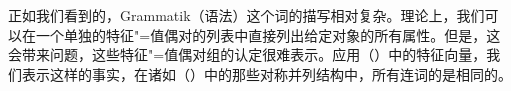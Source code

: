 
正如我们看到的，Grammatik（语法）这个词的描写相对复杂。理论上，我们可以在一个单独的特征"=值偶对的列表中直接列出给定对象的所有属性。但是，这会带来问题，这些特征"=值偶对组的认定很难表示。应用（）中的特征向量，我们表示这样的事实，在诸如（）中的那些对称并列结构中，所有连词的\catvsc 是相同的。 \label{Seite-HPSG-Koordination}

